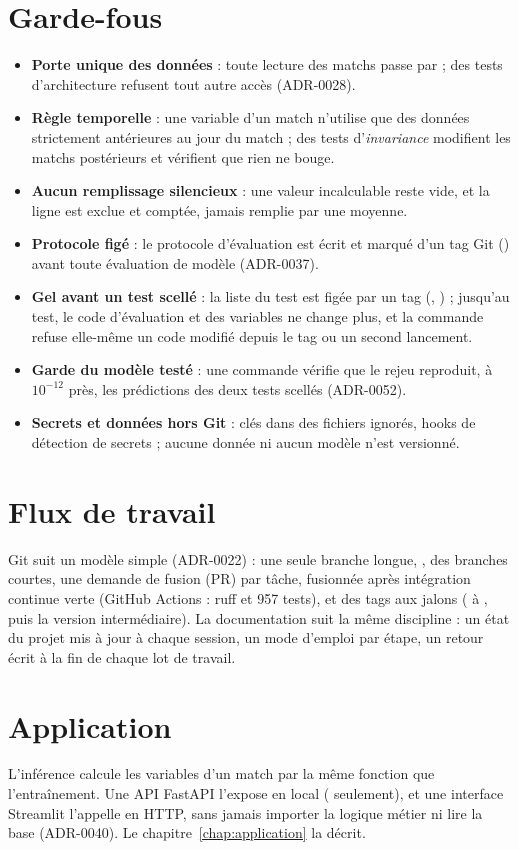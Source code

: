 \section{Garde-fous}

\begin{itemize}
  \item \textbf{Porte unique des données} : toute lecture des matchs passe par
         ; des tests d'architecture refusent tout autre accès (ADR-0028).
  \item \textbf{Règle temporelle} : une variable d'un match n'utilise que des données strictement
        antérieures au jour du match ; des tests d'\emph{invariance} modifient les matchs postérieurs et
        vérifient que rien ne bouge.
  \item \textbf{Aucun remplissage silencieux} : une valeur incalculable reste vide, et la ligne est
        exclue et comptée, jamais remplie par une moyenne.
  \item \textbf{Protocole figé} : le protocole d'évaluation est écrit et marqué d'un tag Git
        () avant toute évaluation de modèle (ADR-0037).
  \item \textbf{Gel avant un test scellé} : la liste du test est figée par un tag (,
        ) ; jusqu'au test, le code d'évaluation et des variables ne change plus, et la
        commande refuse elle-même un code modifié depuis le tag ou un second lancement.
  \item \textbf{Garde du modèle testé} : une commande vérifie que le rejeu reproduit, à
        \(10^{-12}\) près, les prédictions des deux tests scellés (ADR-0052).
  \item \textbf{Secrets et données hors Git} : clés dans des fichiers  ignorés, hooks de
        détection de secrets ; aucune donnée ni aucun modèle n'est versionné.
\end{itemize}

\section{Flux de travail}

Git suit un modèle simple (ADR-0022) : une seule branche longue, , des branches courtes, une
demande de fusion (PR) par tâche, fusionnée après intégration continue verte (GitHub Actions : ruff et
957 tests), et des tags aux jalons ( à , puis la version intermédiaire). La documentation suit la même
discipline : un état du projet mis à jour à chaque session, un mode d'emploi par étape, un retour écrit
à la fin de chaque lot de travail.

\section{Application}

L'inférence calcule les variables d'un match par la même fonction que l'entraînement. Une API FastAPI
l'expose en local ( seulement), et une interface Streamlit l'appelle en HTTP, sans jamais
importer la logique métier ni lire la base (ADR-0040). Le chapitre~\ref{chap:application} la décrit.

